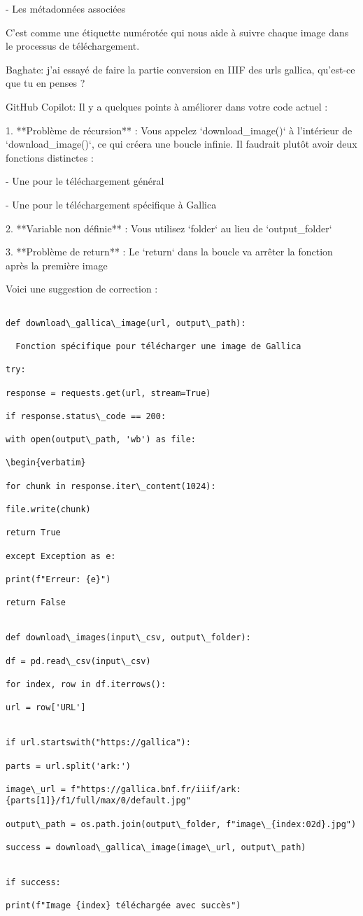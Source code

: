 - Les métadonnées associées

C'est comme une étiquette numérotée qui nous aide à suivre chaque image dans le processus de téléchargement.

Baghate: j'ai essayé de faire la partie conversion en IIIF des urls gallica, qu'est-ce que tu en penses ?

GitHub Copilot: Il y a quelques points à améliorer dans votre code actuel :

1. **Problème de récursion** : Vous appelez `download\_image()` à l'intérieur de `download\_image()`, ce qui créera une boucle infinie. Il faudrait plutôt avoir deux fonctions distinctes :

- Une pour le téléchargement général

- Une pour le téléchargement spécifique à Gallica

2. **Variable non définie** : Vous utilisez `folder` au lieu de `output\_folder`

3. **Problème de return** : Le `return` dans la boucle va arrêter la fonction après la première image

Voici une suggestion de correction :

\begin{verbatim}

def download\_gallica\_image(url, output\_path):

  Fonction spécifique pour télécharger une image de Gallica

try:

response = requests.get(url, stream=True)

if response.status\_code == 200:

with open(output\_path, 'wb') as file:

\begin{verbatim}

for chunk in response.iter\_content(1024):

file.write(chunk)

return True

except Exception as e:

print(f"Erreur: {e}")

return False


def download\_images(input\_csv, output\_folder):

df = pd.read\_csv(input\_csv)

for index, row in df.iterrows():

url = row['URL']


if url.startswith("https://gallica"):

parts = url.split('ark:')

image\_url = f"https://gallica.bnf.fr/iiif/ark:{parts[1]}/f1/full/max/0/default.jpg"

output\_path = os.path.join(output\_folder, f"image\_{index:02d}.jpg")

success = download\_gallica\_image(image\_url, output\_path)


if success:

print(f"Image {index} téléchargée avec succès")

\end{verbatim}


